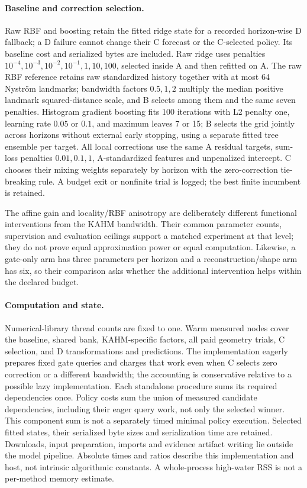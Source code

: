 \paragraph{Baseline and correction selection.}
Raw RBF and boosting retain the fitted ridge state for a recorded
horizon-wise D fallback; a D failure cannot change their C forecast or
the C-selected policy. Its baseline cost and serialized bytes are included.
Raw ridge uses penalties $10^{-4},10^{-3},10^{-2},10^{-1},1,10,100$,
selected inside A and then refitted on A. The raw RBF reference retains
raw standardized history together with at most 64 Nystr\"om landmarks;
bandwidth factors $0.5,1,2$ multiply the median positive landmark
squared-distance scale, and B selects among them and the same seven
penalties.
Histogram gradient boosting fits 100 iterations with L2 penalty one,
learning rate $0.05$ or $0.1$, and maximum leaves 7 or 15; B selects the
grid jointly across horizons without external early stopping, using
a separate fitted tree ensemble per target. All local corrections use the
same A residual targets, sum-loss penalties $0.01,0.1,1$, A-standardized
features and unpenalized intercept. C chooses their mixing weights
separately by horizon with the zero-correction tie-breaking rule. A budget exit or
nonfinite trial is logged; the best finite incumbent is retained.

The affine gain and locality/RBF anisotropy are deliberately different
functional interventions from the KAHM bandwidth. Their common parameter
counts, supervision and evaluation ceilings support a matched experiment
at that level; they do not prove equal approximation power or equal
computation. Likewise, a gate-only arm has three parameters per horizon
and a reconstruction/shape arm has six, so their comparison asks whether
the additional intervention helps within the declared budget.

\paragraph{Computation and state.}
Numerical-library thread counts are fixed to one. Warm measured nodes
cover the baseline, shared bank, KAHM-specific factors, all paid geometry
trials, C selection, and D transformations and predictions. The implementation eagerly prepares
fixed gate queries and charges that work even when C selects zero
correction or a different bandwidth; the accounting is conservative
relative to a possible lazy implementation.
Each standalone procedure sums its required dependencies once. Policy
costs sum the union of measured candidate dependencies, including their
eager query work, not only the selected winner. This component sum is not
a separately timed minimal policy execution. Selected fitted states, their serialized byte sizes and
serialization time are retained. Downloads, input preparation, imports
and evidence artifact writing lie outside the model pipeline. Absolute
times and ratios describe this implementation and host, not intrinsic
algorithmic constants. A whole-process high-water RSS is not a
per-method memory estimate.

